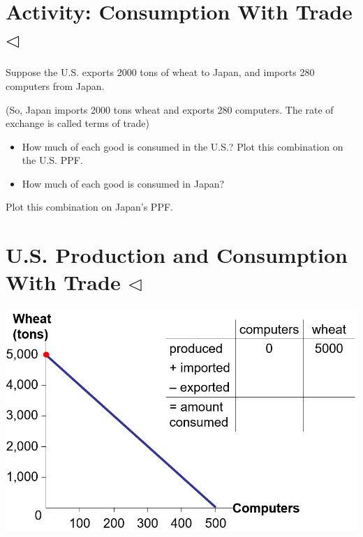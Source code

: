 \documentclass[
]{book}
\begin{document}
\hypertarget{activity-consumption-with-trade-triangleleft}{%
\section{\texorpdfstring{Activity: Consumption With Trade \(\triangleleft\)}{Activity: Consumption With Trade \textbackslash triangleleft}}\label{activity-consumption-with-trade-triangleleft}}

Suppose the U.S. exports 2000 tons of wheat to Japan, and imports 280 computers from Japan.

\bigskip

(So, Japan imports 2000 tons wheat and exports 280 computers. The rate of exchange is called terms of trade)

\begin{itemize}
\item
  How much of each good is consumed in the U.S.? Plot this combination on the U.S. PPF.
\item
  How much of each good is consumed in Japan?
\end{itemize}

Plot this combination on Japan's PPF.

\hypertarget{u.s.-production-and-consumption-with-trade-triangleleft}{%
\section{\texorpdfstring{U.S. Production and Consumption With Trade \(\triangleleft\)}{U.S. Production and Consumption With Trade \textbackslash triangleleft}}\label{u.s.-production-and-consumption-with-trade-triangleleft}}

\includegraphics[width=\textwidth,height=0.75\textheight]{images/lesson02/part2/page19.PNG}
\end{document}
